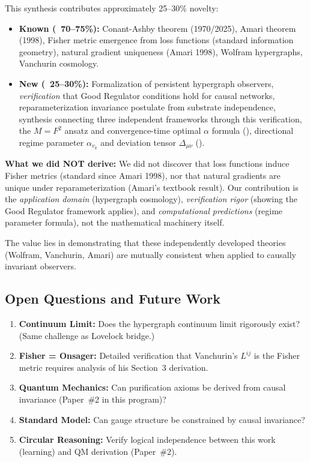 \documentclass[11pt,a4paper]{article}
\theoremstyle{plain}
\theoremstyle{definition}
\theoremstyle{remark}
\begin{document}
This synthesis contributes approximately 25--30\% novelty:
\begin{itemize}[noitemsep]
\item \textbf{Known (~70--75\%):} Conant-Ashby theorem (1970/2025), Amari theorem (1998), Fisher metric emergence from loss functions (standard information geometry), natural gradient uniqueness (Amari 1998), Wolfram hypergraphs, Vanchurin cosmology.
\item \textbf{New (~25--30\%):} Formalization of persistent hypergraph observers, \emph{verification} that Good Regulator conditions hold for causal networks, reparameterization invariance postulate from substrate independence, synthesis connecting three independent frameworks through this verification, the $M = F^2$ ansatz and convergence-time optimal $\alpha$ formula (), directional regime parameter $\alpha_{v_k}$ and deviation tensor $\Delta_{\mu\nu}$ ().
\end{itemize}

\textbf{What we did NOT derive:} We did not discover that loss functions induce Fisher metrics (standard since Amari 1998), nor that natural gradients are unique under reparameterization (Amari's textbook result). Our contribution is the \emph{application domain} (hypergraph cosmology), \emph{verification rigor} (showing the Good Regulator framework applies), and \emph{computational predictions} (regime parameter formula), not the mathematical machinery itself.

The value lies in demonstrating that these independently developed theories (Wolfram, Vanchurin, Amari) are mutually consistent when applied to causally invariant observers.

\subsection{Open Questions and Future Work}

\begin{enumerate}[noitemsep]
\item \textbf{Continuum Limit:} Does the hypergraph continuum limit rigorously exist? (Same challenge as Lovelock bridge.)

\item \textbf{Fisher = Onsager:} Detailed verification that Vanchurin's $L^{ij}$ is the Fisher metric requires analysis of his Section~3 derivation.

\item \textbf{Quantum Mechanics:} Can purification axioms be derived from causal invariance (Paper~\#2 in this program)?

\item \textbf{Standard Model:} Can gauge structure be constrained by causal invariance?

\item \textbf{Circular Reasoning:} Verify logical independence between this work (learning) and QM derivation (Paper~\#2).
\end{enumerate}
\end{document}
